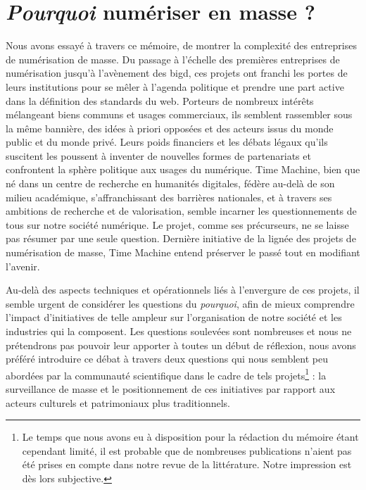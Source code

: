 
\chapter{\textit{Pourquoi} numériser en masse ? }

Nous avons essayé à travers ce mémoire, de montrer la complexité des entreprises de numérisation de masse. Du passage à l'échelle des premières entreprises de numérisation jusqu'à l'avènement des \gls{bigd}, ces projets ont franchi les portes de leurs institutions pour se mêler à l'agenda politique et prendre une part active dans la définition des standards du web. Porteurs de nombreux intérêts mélangeant biens communs et usages commerciaux, ils semblent rassembler sous la même bannière, des idées à priori opposées et des acteurs issus du monde public et du monde privé. Leurs poids financiers et les débats légaux qu'ils suscitent les poussent à inventer de nouvelles formes de partenariats et confrontent la sphère politique aux usages du numérique. Time Machine, bien que né dans un centre de recherche en humanités digitales, fédère au-delà de son milieu académique, s'affranchissant des barrières nationales, et à travers ses ambitions de recherche et de valorisation, semble incarner les questionnements de tous sur notre société numérique. Le projet, comme ses précurseurs, ne se laisse pas résumer par une seule question. Dernière initiative de la lignée des projets de numérisation de masse, Time Machine entend préserver le passé tout en modifiant l'avenir.

Au-delà des aspects techniques et opérationnels liés à l'envergure de ces projets, il semble urgent de considérer les questions du \textit{pourquoi}, afin de mieux comprendre l'impact d'initiatives de telle ampleur sur l'organisation de notre société et les industries qui la composent. Les questions soulevées sont nombreuses et nous ne prétendrons pas pouvoir leur apporter à toutes un début de réflexion, nous avons préféré introduire ce débat à travers deux questions qui nous semblent peu abordées par la communauté scientifique dans le cadre de tels projets\footnote{Le temps que nous avons eu à disposition pour la rédaction du mémoire étant cependant limité, il est probable que de nombreuses publications n'aient pas été prises en compte dans notre revue de la littérature. Notre impression est dès lors subjective.} : la surveillance de masse et le positionnement de ces initiatives par rapport aux acteurs culturels et patrimoniaux plus traditionnels.

